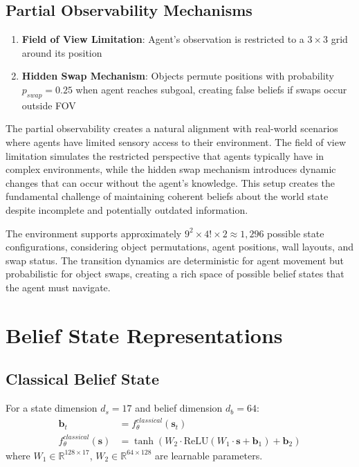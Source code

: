 \documentclass[11pt]{article}
\begin{document}
\subsection{Partial Observability Mechanisms}
\begin{enumerate}
    \item \textbf{Field of View Limitation}: Agent's observation is restricted to a $3 \times 3$ grid around its position
    \item \textbf{Hidden Swap Mechanism}: Objects permute positions with probability $p_{swap} = 0.25$ when agent reaches subgoal, creating false beliefs if swaps occur outside FOV
\end{enumerate}

The partial observability creates a natural alignment with real-world scenarios where agents have limited sensory access to their environment. The field of view limitation simulates the restricted perspective that agents typically have in complex environments, while the hidden swap mechanism introduces dynamic changes that can occur without the agent's knowledge. This setup creates the fundamental challenge of maintaining coherent beliefs about the world state despite incomplete and potentially outdated information.

The environment supports approximately $9^2 \times 4! \times 2 \approx 1,296$ possible state configurations, considering object permutations, agent positions, wall layouts, and swap status. The transition dynamics are deterministic for agent movement but probabilistic for object swaps, creating a rich space of possible belief states that the agent must navigate.

\section{Belief State Representations}

\subsection{Classical Belief State}
For a state dimension $d_s = 17$ and belief dimension $d_b = 64$:
\begin{align}
    \mathbf{b}_t &= f_{\theta}^{classical}(\mathbf{s}_t) \\
    f_{\theta}^{classical}(\mathbf{s}) &= \tanh(W_2 \cdot \text{ReLU}(W_1 \cdot \mathbf{s} + \mathbf{b}_1) + \mathbf{b}_2)
\end{align}
where $W_1 \in \mathbb{R}^{128 \times 17}$, $W_2 \in \mathbb{R}^{64 \times 128}$ are learnable parameters.
\end{document}
